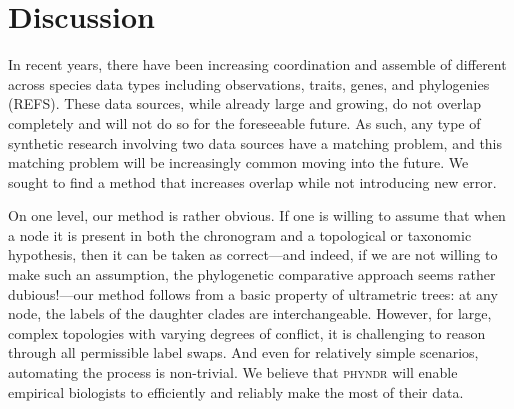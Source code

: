 \documentclass[a4paper,11pt]{article}
\begin{document}
\section{Discussion}


In recent years, there have been increasing coordination and assemble of different across species data types including observations, traits, genes, and phylogenies (REFS).  These data sources, while already large and growing, do not overlap completely and will not do so for the foreseeable future.  As such, any type of synthetic research involving two data sources have a matching problem, and this matching problem will be increasingly common moving into the future.  We sought to find a method that increases overlap while not introducing new error.  

On one level, our method is rather obvious. If one is willing to assume that when a node it is present in both the chronogram and a topological or taxonomic hypothesis, then it can be taken as correct---and indeed, if we are not willing to make such an assumption, the phylogenetic comparative approach seems rather dubious!---our method follows from a basic property of ultrametric trees: at any node, the labels of the daughter clades are interchangeable. However, for large, complex topologies with varying degrees of conflict, it is challenging to reason through all permissible label swaps. And even for relatively simple scenarios, automating the process is non-trivial. We believe that \textsc{phyndr} will enable empirical biologists to efficiently and reliably make the most of their data.
\end{document}
